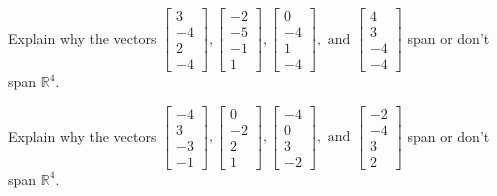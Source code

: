 \documentclass{article}
\begin{document}
\begin{exerciseStatement}
    Explain why the vectors \(\left[\begin{array}{r}
3 \\
-4 \\
2 \\
-4
\end{array}\right] , \left[\begin{array}{r}
-2 \\
-5 \\
-1 \\
1
\end{array}\right] , \left[\begin{array}{r}
0 \\
-4 \\
1 \\
-4
\end{array}\right] , \text{ and } \left[\begin{array}{r}
4 \\
3 \\
-4 \\
-4
\end{array}\right]\) span or don't span \(\mathbb{R}^4\).



  
\end{exerciseStatement}

\begin{exerciseStatement}
    Explain why the vectors \(\left[\begin{array}{r}
-4 \\
3 \\
-3 \\
-1
\end{array}\right] , \left[\begin{array}{r}
0 \\
-2 \\
2 \\
1
\end{array}\right] , \left[\begin{array}{r}
-4 \\
0 \\
3 \\
-2
\end{array}\right] , \text{ and } \left[\begin{array}{r}
-2 \\
-4 \\
3 \\
2
\end{array}\right]\) span or don't span \(\mathbb{R}^4\).



  
\end{exerciseStatement}
\end{document}
